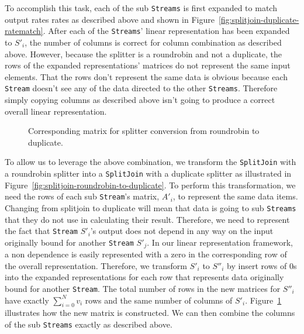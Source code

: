 To accomplish this task, each of the sub {\tt Streams} is first expanded to match output rates rates 
as described above and shown in Figure~\ref{fig:splitjoin-duplicate-ratematch}. 
After each of the {\tt Streams}' linear representation has been expanded to $S'_i$, the number of
columns is correct for column combination as described above. However, because the splitter is a 
roundrobin and not a duplicate, the rows of the expanded representations' matrices do not represent the
same input elements. That the rows don't represent the same data is obvious because each {\tt Stream} 
doesn't see any of the data directed to the other {\tt Streams}. Therefore simply copying columns 
as described above isn't going to produce a correct overall linear representation. 

\begin{figure}
\center
\epsfxsize=3.0in
\caption{Corresponding matrix for splitter conversion from roundrobin to duplicate.}
\label{fig:splitjoin-roundrobin-matrix}
\end{figure}

To allow us to leverage the above combination, we transform the {\tt SplitJoin} with a roundrobin
splitter into a {\tt SplitJoin} with a duplicate splitter as illustrated in 
Figure~\ref{fig:splitjoin-roundrobin-to-duplicate}. To perform this transformation, we need the rows
of each sub {\tt Stream}'s matrix, $A'_i$, to represent the same data items. Changing from splitjoin to 
duplicate will mean that data is going to sub {\tt Streams} that they do not use in calculating their
result. Therefore, we need to represent the fact that {\tt Stream} $S'_i$'s output does not depend in any way on 
the input originally bound for another {\tt Stream} $S'_j$. 
In our linear representation framework, a non dependence is easily represented with a zero in the 
corresponding row of the overall representation. Therefore, we transform $S'_i$ to $S''_i$ by insert rows of $0$s 
into the expanded representations for each row that represents data originally bound for another {\tt Stream}. The
total number of rows in the new matrices for $S''_i$ have exactly $\sum_{i=0}^{N}v_i$ rows and the same number
of columns of $S'_i$. Figure~\ref{fig:splitjoin-roundrobin-matrix} illustrates how the new matrix is constructed.
We can then combine the columns of the sub {\tt Streams} exactly as described above.
